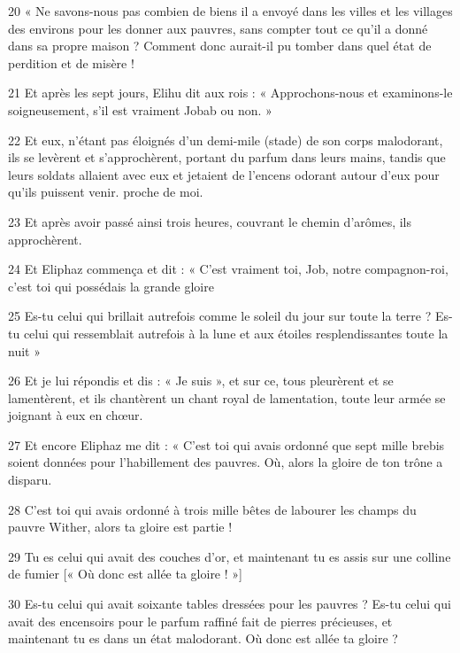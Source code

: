 \par 20 « Ne savons-nous pas combien de biens il a envoyé dans les villes et les villages des environs pour les donner aux pauvres, sans compter tout ce qu'il a donné dans sa propre maison ? Comment donc aurait-il pu tomber dans quel état de perdition et de misère !

\par 21 Et après les sept jours, Elihu dit aux rois : « Approchons-nous et examinons-le soigneusement, s'il est vraiment Jobab ou non. »

\par 22 Et eux, n'étant pas éloignés d'un demi-mile (stade) de son corps malodorant, ils se levèrent et s'approchèrent, portant du parfum dans leurs mains, tandis que leurs soldats allaient avec eux et jetaient de l'encens odorant autour d'eux pour qu'ils puissent venir. proche de moi.

\par 23 Et après avoir passé ainsi trois heures, couvrant le chemin d'arômes, ils approchèrent.

\par 24 Et Eliphaz commença et dit : « C'est vraiment toi, Job, notre compagnon-roi, c'est toi qui possédais la grande gloire

\par 25 Es-tu celui qui brillait autrefois comme le soleil du jour sur toute la terre ? Es-tu celui qui ressemblait autrefois à la lune et aux étoiles resplendissantes toute la nuit »

\par 26 Et je lui répondis et dis : « Je suis », et sur ce, tous pleurèrent et se lamentèrent, et ils chantèrent un chant royal de lamentation, toute leur armée se joignant à eux en chœur.

\par 27 Et encore Eliphaz me dit : « C'est toi qui avais ordonné que sept mille brebis soient données pour l'habillement des pauvres. Où, alors la gloire de ton trône a disparu.

\par 28 C'est toi qui avais ordonné à trois mille bêtes de labourer les champs du pauvre Wither, alors ta gloire est partie !

\par 29 Tu es celui qui avait des couches d'or, et maintenant tu es assis sur une colline de fumier [« Où donc est allée ta gloire ! »]

\par 30 Es-tu celui qui avait soixante tables dressées pour les pauvres ? Es-tu celui qui avait des encensoirs pour le parfum raffiné fait de pierres précieuses, et maintenant tu es dans un état malodorant. Où donc est allée ta gloire ?


